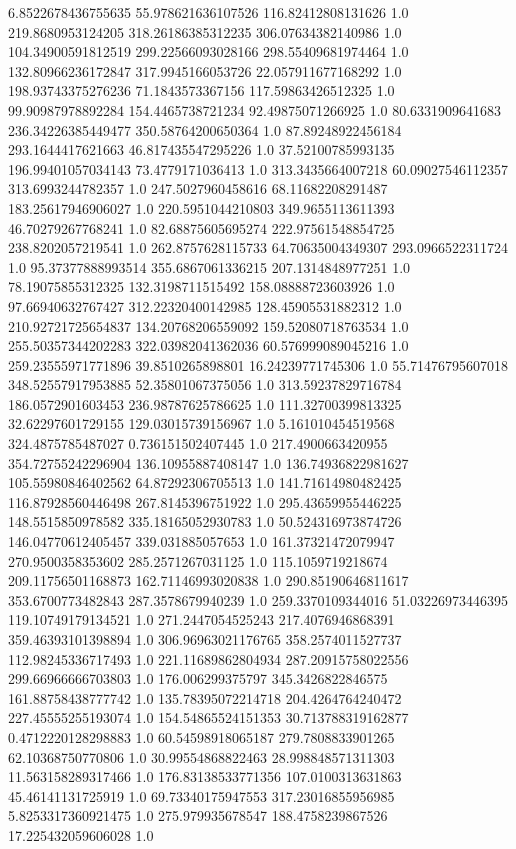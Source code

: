 6.8522678436755635	55.978621636107526	116.82412808131626	1.0
219.8680953124205	318.26186385312235	306.07634382140986	1.0
104.34900591812519	299.22566093028166	298.55409681974464	1.0
132.80966236172847	317.9945166053726	22.057911677168292	1.0
198.93743375276236	71.1843573367156	117.59863426512325	1.0
99.90987978892284	154.4465738721234	92.49875071266925	1.0
80.6331909641683	236.34226385449477	350.58764200650364	1.0
87.89248922456184	293.1644417621663	46.817435547295226	1.0
37.52100785993135	196.99401057034143	73.4779171036413	1.0
313.3435664007218	60.09027546112357	313.6993244782357	1.0
247.5027960458616	68.11682208291487	183.25617946906027	1.0
220.5951044210803	349.9655113611393	46.70279267768241	1.0
82.68875605695274	222.97561548854725	238.8202057219541	1.0
262.8757628115733	64.70635004349307	293.0966522311724	1.0
95.37377888993514	355.6867061336215	207.1314848977251	1.0
78.19075855312325	132.3198711515492	158.08888723603926	1.0
97.66940632767427	312.22320400142985	128.45905531882312	1.0
210.92721725654837	134.20768206559092	159.52080718763534	1.0
255.50357344202283	322.03982041362036	60.576999089045216	1.0
259.23555971771896	39.8510265898801	16.24239771745306	1.0
55.71476795607018	348.52557917953885	52.35801067375056	1.0
313.59237829716784	186.0572901603453	236.98787625786625	1.0
111.32700399813325	32.62297601729155	129.03015739156967	1.0
5.161010454519568	324.4875785487027	0.736151502407445	1.0
217.4900663420955	354.72755242296904	136.10955887408147	1.0
136.74936822981627	105.55980846402562	64.87292306705513	1.0
141.71614980482425	116.87928560446498	267.8145396751922	1.0
295.43659955446225	148.5515850978582	335.18165052930783	1.0
50.524316973874726	146.04770612405457	339.031885057653	1.0
161.37321472079947	270.9500358353602	285.2571267031125	1.0
115.1059719218674	209.11756501168873	162.71146993020838	1.0
290.85190646811617	353.6700773482843	287.3578679940239	1.0
259.3370109344016	51.03226973446395	119.10749179134521	1.0
271.2447054525243	217.4076946868391	359.46393101398894	1.0
306.96963021176765	358.2574011527737	112.98245336717493	1.0
221.11689862804934	287.20915758022556	299.66966666703803	1.0
176.006299375797	345.3426822846575	161.88758438777742	1.0
135.78395072214718	204.4264764240472	227.45555255193074	1.0
154.54865524151353	30.713788319162877	0.4712220128298883	1.0
60.54598918065187	279.7808833901265	62.10368750770806	1.0
30.99554868822463	28.998848571311303	11.563158289317466	1.0
176.83138533771356	107.0100313631863	45.46141131725919	1.0
69.73340175947553	317.23016855956985	5.8253317360921475	1.0
275.979935678547	188.4758239867526	17.225432059606028	1.0
